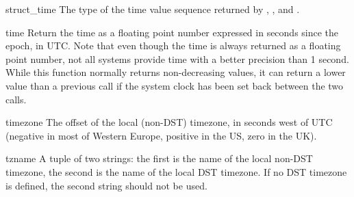 \begin{datadesc}{struct_time}
The type of the time value sequence returned by ,
, and .
\end{datadesc}

\begin{funcdesc}{time}{}
Return the time as a floating point number expressed in seconds since
the epoch, in UTC.  Note that even though the time is always returned
as a floating point number, not all systems provide time with a better
precision than 1 second.  While this function normally returns
non-decreasing values, it can return a lower value than a previous
call if the system clock has been set back between the two calls.
\end{funcdesc}

\begin{datadesc}{timezone}
The offset of the local (non-DST) timezone, in seconds west of UTC
(negative in most of Western Europe, positive in the US, zero in the
UK).
\end{datadesc}

\begin{datadesc}{tzname}
A tuple of two strings: the first is the name of the local non-DST
timezone, the second is the name of the local DST timezone.  If no DST
timezone is defined, the second string should not be used.
\end{datadesc}


